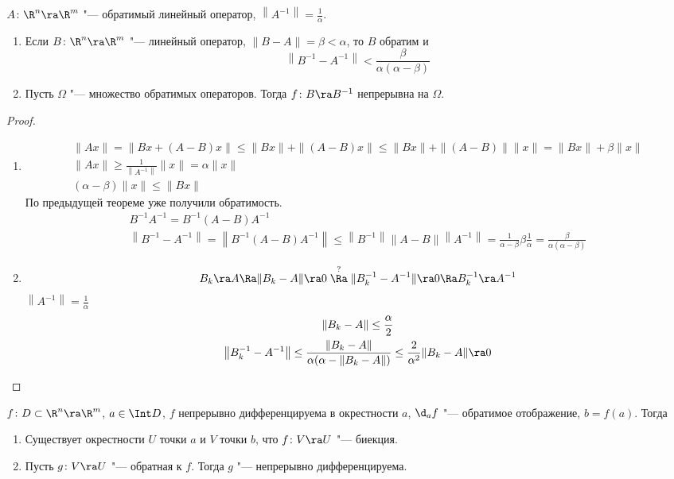 \begin{theorem}
	$A\colon \R^n \ra \R^m$ "--- обратимый линейный оператор, $\left\|A^{-1}\right\| = \frac1\alpha$.
	\begin{enumerate}
	\item
		Если $B\colon \R^n \ra \R^m$ "--- линейный оператор, $\|B - A\| = \beta < \alpha$, то $B$ обратим и
		\[ \left\|B^{-1} - A^{-1}\right\| < \frac{\beta}{\alpha(\alpha - \beta)} \]

	\item
		Пусть $\Omega$ "--- множество обратимых операторов. Тогда $f\colon B \ra B^{-1}$ непрерывна на $\Omega$.
	\end{enumerate}
\end{theorem}
\begin{proof}
	\begin{enumerate}
	\item
		\begin{gather*}
			\|Ax\| = \|Bx + (A-B)x\| \le \|Bx\| + \|(A - B)x\| \le \|Bx\| + \|(A - B)\| \|x\| = \|Bx\| + \beta \|x\| \\
			\|Ax\| \ge \frac{1}{\left\|A^{-1}\right\|} \|x\| = \alpha \|x\| \\
			(\alpha - \beta) \|x\| \le \|Bx\|
		\end{gather*}
		По предыдущей теореме уже получили обратимость.
		\begin{gather*}
			B^{-1} A^{-1} = B^{-1} (A - B) A^{-1} \\
			\left\|B^{-1} - A^{-1}\right\| = \left\|B^{-1} (A - B) A^{-1}\right\| \le \left\|B^{-1}\right\| \|A - B\| \left\|A^{-1}\right\|
				= \frac1{\alpha - \beta}\beta\frac1\alpha = \frac{\beta}{\alpha(\alpha - \beta)}
		\end{gather*}

	\item
		\[ B_k \ra A \Ra \|B_k - A\| \ra 0 \stackrel{?}{\Ra} \|B_k^{-1} - A^{-1}\| \ra 0 \Ra B_k^{-1} \ra A^{-1} \]
		$\left\|A^{-1}\right\| = \frac1\alpha$
		\begin{gather*}
			\|B_k - A\| \le \frac{\alpha}2 \\
			\left\|B_k^{-1} - A^{-1}\right\| \le \frac{\|B_k - A\|}{\alpha(\alpha - \|B_k - A\|)} \le \frac{2}{\alpha^2} \|B_k - A\| \ra 0
		\end{gather*}
	\end{enumerate}
\end{proof}

\begin{theorem}
	$f\colon D \subset \R^n \ra \R^m$, $a \in \Int D$, $f$ непрерывно дифференцируема в окрестности $a$, $\d_a f$ "--- обратимое отображение, $b = f(a)$.
	Тогда
	\begin{enumerate}
	\item
		Существует окрестности $U$ точки $a$ и $V$ точки $b$, что $f\colon V \ra U$ "--- биекция.

	\item
		Пусть $g\colon V \ra U$ "--- обратная к $f$. Тогда $g$ "--- непрерывно дифференцируема.
	\end{enumerate}
\end{theorem}

